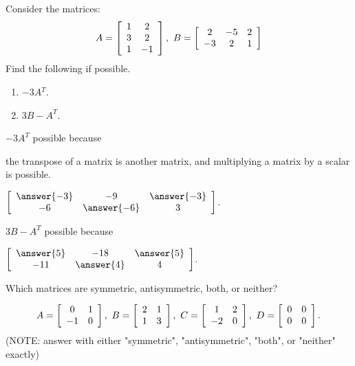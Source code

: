 \documentclass{ximera}
\author{Zack Reed}
\begin{document}
\begin{exercise}


  Consider the matrices:
  \begin{equation*}
    A = \startmat{cc}
      1 & 2 \\
      3 & 2 \\
      1 & -1
    \stopmat,
    \quad
    B = \startmat{ccc}
      2 & -5 & 2 \\
      -3 & 2 & 1
    \stopmat
  \end{equation*}
  Find the following if possible.
  \begin{enumerate}
  \item $-3A{^T}$.
  \item $3B - A^T$.
  \end{enumerate}

  $-3A^T$  possible because

  \begin{feedback}
    the transpose of a matrix is another matrix, and multiplying a matrix by a scalar is possible.
  \end{feedback}


$\startmat{ccc}
        \answer{-3} & -9 & \answer{-3} \\
        -6 & \answer{-6} & 3
      \stopmat$.


$3B - A^T$  possible because

  \begin{problem}
\begin{selectAll}
\end{selectAll}

$\startmat{ccc}
        \answer{5} & -18 & \answer{5} \\
        -11 & \answer{4} & 4
      \stopmat$.
      \end{problem}



  Which matrices are symmetric, antisymmetric, both,
  or neither?

  \begin{equation*}
    A = \startmat{cc}
      0 & 1 \\
      -1 & 0
    \stopmat,
    \quad
    B = \startmat{cc}
      2 & 1 \\
      1 & 3
    \stopmat,
    \quad
    C = \startmat{cc}
      1 & 2 \\
      -2 & 0
    \stopmat,
    \quad
    D = \startmat{cc}
      0 & 0 \\
      0 & 0
    \stopmat.
  \end{equation*}
  (NOTE: answer with either "symmetric", "antisymmetric", "both", or "neither" exactly)


\end{exercise}
\end{document}
